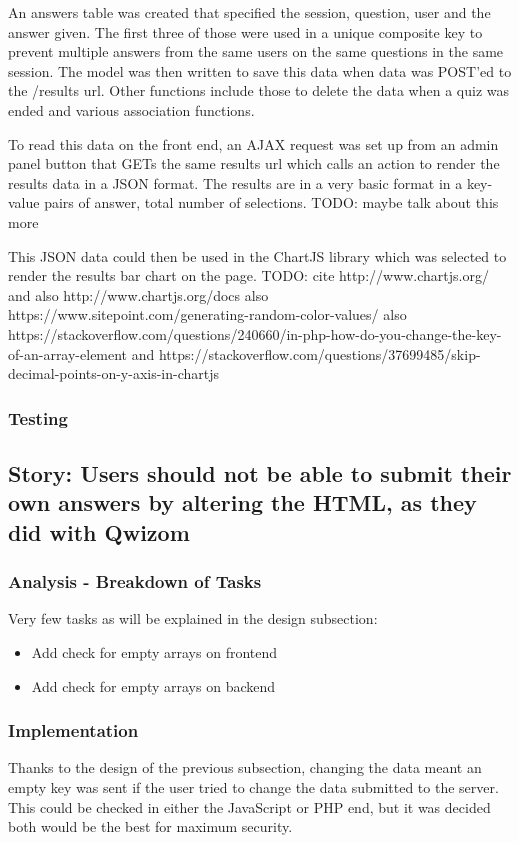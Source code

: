 An answers table was created that specified the session, question, user and the answer given. The first three of those were used in a unique composite key to prevent multiple answers from the same users on the same questions in the same session. The model was then written to save this data when data was POST'ed to the /results url. Other functions include those to delete the data when a quiz was ended and various association functions.

To read this data on the front end, an AJAX request was set up from an admin panel button that GETs the same results url which calls an action to render the results data in a JSON format. The results are in a very basic format in a key-value pairs of answer, total number of selections. TODO: maybe talk about this more

This JSON data could then be used in the ChartJS library which was selected to render the results bar chart on the page. TODO: cite http://www.chartjs.org/ and also http://www.chartjs.org/docs also https://www.sitepoint.com/generating-random-color-values/ also https://stackoverflow.com/questions/240660/in-php-how-do-you-change-the-key-of-an-array-element and https://stackoverflow.com/questions/37699485/skip-decimal-points-on-y-axis-in-chartjs
\subsubsection{Testing}
\newpage

\subsection{Story: Users should not be able to submit their own answers by altering the HTML, as they did with Qwizom}
\subsubsection{Analysis - Breakdown of Tasks}
Very few tasks as will be explained in the design subsection:
\begin{itemize}
	\item Add check for empty arrays on frontend
	\item Add check for empty arrays on backend
\end{itemize}
\subsubsection{Implementation}
Thanks to the design of the previous subsection, changing the data meant an empty key was sent if the user tried to change the data submitted to the server. This could be checked in either the JavaScript or PHP end, but it was decided both would be the best for maximum security. 
